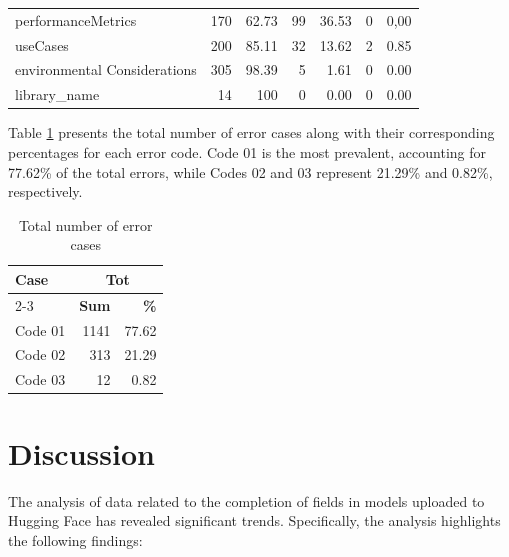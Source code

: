 \documentclass[12pt,a4paper, oneside, openright]{book}
\begin{document}
\begin{table}[!h]
\begin{tabular}{lrrrrrr}
performanceMetrics             & 170               & 62.73          & 99                & 36.53          & 0                 & 0,00           \\
useCases                       & 200               & 85.11          & 32                & 13.62          & 2                 & 0.85           \\
environmental Considerations   & 305               & 98.39          & 5                 & 1.61           & 0                 & 0.00           \\
library\_name                  & 14                & 100          & 0                 & 0.00           & 0                 & 0.00          \\
\bottomrule
\end{tabular}
\end{table}

\newpage
Table \ref{tab:totalError} presents the total number of error cases along with their corresponding percentages for each error code. Code 01 is the most prevalent, accounting for 77.62\% of the total errors, while Codes 02 and 03 represent 21.29\% and 0.82\%, respectively.


\begin{table}[!h]
\centering
\caption{Total number of error cases }
\label{tab:totalError}
\begin{tabular}{lrr}
\toprule
\multirow{2.5}{*}{\textbf{Case}} & \multicolumn{2}{c}{\textbf{Tot}} \\
\cmidrule{2-3}
                               & \textbf{Sum}    & \textbf{\%}    \\
\midrule
Code 01                        & 1141            & 77.62          \\
Code 02                        & 313             & 21.29          \\
Code 03                        & 12              & 0.82          \\
\bottomrule
\end{tabular}
\end{table}

\clearpage
\section{Discussion}
The analysis of data related to the completion of fields in models uploaded to Hugging Face has revealed significant trends. Specifically, the analysis highlights the following findings:
\end{document}
